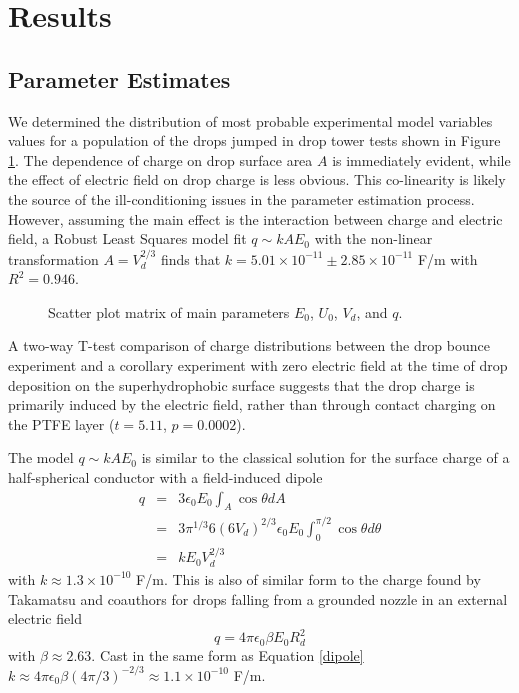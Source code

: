 \documentclass[aip,reprint, floatfix]{revtex4-1}
\begin{document}
\section{Results}
\subsection{Parameter Estimates}
We determined the distribution of most probable experimental model variables values for a population of the drops jumped in drop tower tests shown in Figure \ref{fig:scatter}. The dependence of charge on drop surface area $A$ is immediately evident, while the effect of electric field on drop charge is less obvious. This co-linearity is likely the source of the ill-conditioning issues in the parameter estimation process. However, assuming the main effect is the interaction between charge and electric field, a Robust Least Squares model fit $q \sim kAE_0$ with the non-linear transformation $A = V_d^{2/3}$ finds that $k=5.01 \times 10^{-11} \pm  2.85 \times 10^{-11}$ F/m with $R^2 = 0.946$. 
\begin{figure}[h]
    \centering
    \resizebox{0.5\textwidth}{!}{}
    \caption{Scatter plot matrix of main parameters $E_0$, $U_0$, $V_d$, and $q$.\label{fig:scatter}}
\end{figure}

A two-way T-test comparison of charge distributions between the drop bounce experiment and a corollary experiment with zero electric field at the time of drop deposition on the superhydrophobic surface suggests that the drop charge is primarily induced by the electric field, rather than through contact charging on the PTFE layer ($t = 5.11$, $p = 0.0002$).

The model $q \sim kAE_0$ is similar to the classical solution for the surface charge of a half-spherical conductor with a field-induced dipole \cite{david_j._griffiths_introduction_1999}
\begin{eqnarray}
q &=& 3 \epsilon_0 E_0 \int_A \cos \theta dA \nonumber \\
&=& 3 \pi^{1/3} 6 \left(6 V_d \right)^{2/3} \epsilon_0 E_0 \int^{\pi / 2}_{0} \!\!\!\!\! \cos \theta d\theta \nonumber \\
&=& k E_0 V_d^{2/3} \label{dipole}
\end{eqnarray}
with $k \approx 1.3 \times 10^{-10}$ F/m. This is also of similar form to the charge found by Takamatsu and coauthors for drops falling from a grounded nozzle in an external electric field \cite{takamatsu_theoretical_1981}
\[q = 4 \pi \epsilon_0 \beta E_0 R_d^2 \]
with $\beta \approx 2.63$. Cast in the same form as Equation \ref{dipole} $k \approx 4 \pi \epsilon_0 \beta (4 \pi/3)^{-2/3} \approx 1.1 \times 10^{-10}$ F/m.
\end{document}

